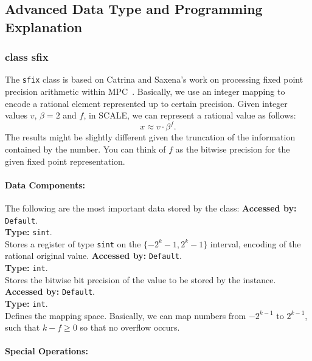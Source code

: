 \subsection{Advanced Data Type and Programming Explanation}
		
\subsubsection{class sfix}
The \verb|sfix| class is based on Catrina and Saxena's work on processing fixed point precision arithmetic within MPC~\cite{CS10}. Basically, we use an integer mapping to encode a rational element represented up to certain precision. 
Given integer values $v$, $\beta =2$ and $f$, in SCALE, we can represent a rational value as follows:
	\[
	  x \approx v \cdot \beta ^{f}.
	\]
The results might be slightly different given the truncation of the information contained by the number. You can think of $f$ as the bitwise precision for the given fixed point representation.

	\paragraph{Data Components:}
	The following are the most important data stored by the class:
	\textbf{Accessed by:} \verb|Default|.\\
	\textbf{Type:} \verb|sint|.\\
	Stores a register of type \verb|sint| on the $\{-2^k-1, 2^k-1\}$ interval, encoding of the rational original value.
	\textbf{Accessed by:} \verb|Default|.\\
	\textbf{Type:} \verb|int|.\\
	Stores the bitwise bit precision of the value to be stored by the instance.
	\textbf{Accessed by:} \verb|Default|.\\
	\textbf{Type:} \verb|int|.\\
	Defines the mapping space. Basically, we can map numbers  from $-2^{k-1}$ to $2^{k-1}$, such that $k-f \geq 0$ so that no overflow occurs.
	
	\paragraph {Special Operations:}

